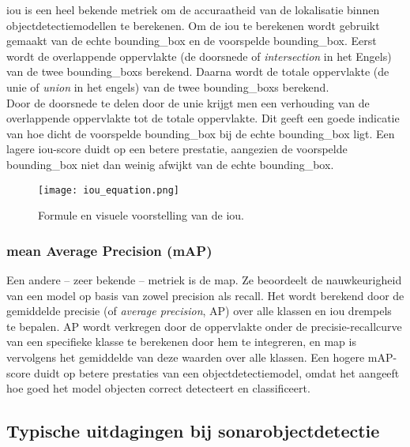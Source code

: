 \gls{iou} is een heel bekende metriek om de accuraatheid van de lokalisatie binnen objectdetectiemodellen te berekenen. Om de \gls{iou} te berekenen wordt gebruikt gemaakt van de echte \gls{bounding_box} en de voorspelde \gls{bounding_box}. Eerst wordt de overlappende oppervlakte (de doorsnede of \emph{intersection} in het Engels) van de twee \glspl{bounding_box} berekend. Daarna wordt de totale oppervlakte (de unie of \emph{union} in het engels) van de twee \glspl{bounding_box} berekend. \\

Door de doorsnede te delen door de unie krijgt men een verhouding van de overlappende oppervlakte tot de totale oppervlakte. Dit geeft een goede indicatie van hoe dicht de voorspelde \gls{bounding_box} bij de echte \gls{bounding_box} ligt. Een lagere \gls{iou}-score duidt op een betere prestatie, aangezien de voorspelde \gls{bounding_box} niet dan weinig afwijkt van de echte \gls{bounding_box}. \autocite{Rezatofighi_2019}

\begin{figure}[H]
    \centering
    \texttt{[image: iou\_equation.png]}
    \caption[Voorstelling van IoU.]{\label{fig:iou_equation}Formule en visuele voorstelling van de \acrfull{iou}. \autocite{Rosebrock_2016}}
\end{figure}

\subsubsection{mean Average Precision (mAP)}

Een andere -- zeer bekende -- metriek is de \acrfull{map}. Ze beoordeelt de nauwkeurigheid van een model op basis van zowel \gls{precision} als \gls{recall}. Het wordt berekend door de gemiddelde precisie (of \emph{average precision}, AP) over alle klassen en \gls{iou} drempels te bepalen. AP wordt verkregen door de oppervlakte onder de precisie-recallcurve van een specifieke klasse te berekenen door hem te integreren, en \gls{map} is vervolgens het gemiddelde van deze waarden over alle klassen. Een hogere mAP-score duidt op betere prestaties van een objectdetectiemodel, omdat het aangeeft hoe goed het model objecten correct detecteert en classificeert. \autocite{Wang_2022}

\subsection{Typische uitdagingen bij sonarobjectdetectie}

